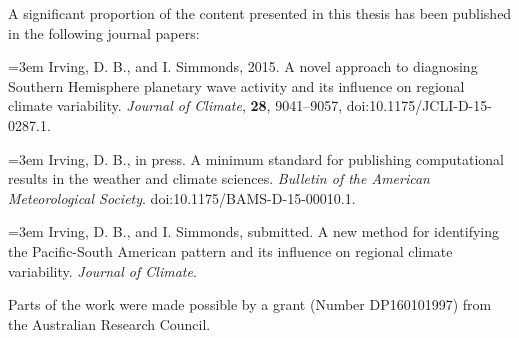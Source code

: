 
\begin{preface}

A significant proportion of the content presented in this thesis has been published in the following journal papers:

\vspace{5mm}
\hangindent=3em
Irving, D. B., and I. Simmonds, 2015. A novel approach to diagnosing Southern Hemisphere planetary wave activity and its influence on regional climate variability. \textit{Journal of Climate}, \textbf{28}, 9041--9057, doi:10.1175/JCLI-D-15-0287.1.

\vspace{5mm}
\hangindent=3em
Irving, D. B., in press. A minimum standard for publishing computational results in the weather and climate sciences. \textit{Bulletin of the American Meteorological Society}. doi:10.1175/BAMS-D-15-00010.1.

\vspace{5mm}
\hangindent=3em
Irving, D. B., and I. Simmonds, submitted. A new method for identifying the Pacific-South American pattern and its influence on regional climate variability. \textit{Journal of Climate}.

\vspace{5mm}
\noindent Parts of the work were made possible by a grant (Number DP160101997) from the Australian Research Council. 

\end{preface}

